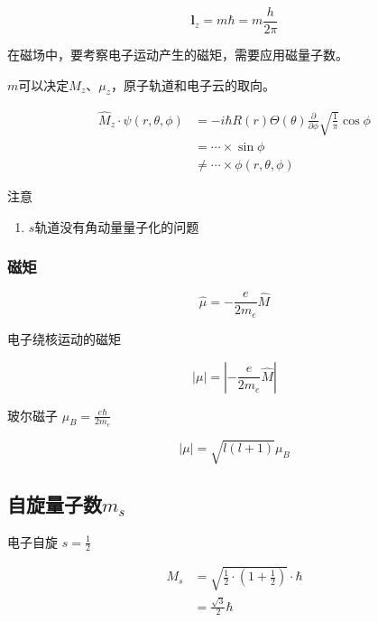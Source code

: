 \begin{equation*}
    \mathbf{l}_z = m\hbar = m\frac{h}{2\pi}
\end{equation*}

在磁场中，要考察电子运动产生的磁矩，需要应用磁量子数。

$m$可以决定$M_z$、$\mu_{z}$，原子轨道和电子云的取向。



\begin{align*}
    \hat{M}_z \cdot \psi (r, \theta, \phi) &= -i \hbar R(r) \Theta(\theta) \frac{\partial}{\partial \phi} \sqrt{\frac{1}{\pi}} \cos \phi  \\ 
    &= \cdots \times \sin \phi \\ 
    &\neq \cdots \times \phi(r, \theta, \phi)
\end{align*}


注意 
\begin{enumerate}
    \item $s$轨道没有角动量量子化的问题
\end{enumerate}

\subsubsection{磁矩}

\begin{equation*}
    \hat{\mu} = -\frac{e}{2m_e} \hat{M}
\end{equation*}

电子绕核运动的磁矩

\begin{equation*}
    |\mu| = \left\lvert -\frac{e}{2m_e} \hat{M} \right\rvert
\end{equation*}

玻尔磁子 $\mu_B = \frac{e\hbar}{2m_e}$

\begin{equation*}
    |\mu| = \sqrt{l(l + 1)} \mu_B
\end{equation*}


\subsection{自旋量子数$m_s$}

电子自旋 $s = \frac{1}{2}$ 


\begin{align*}
    M_s &= \sqrt{\frac{1}{2} \cdot \left( 1 + \frac{1}{2} \right)} \cdot \hbar \\ 
    &= \frac{\sqrt{3}}{2} \hbar
\end{align*}



